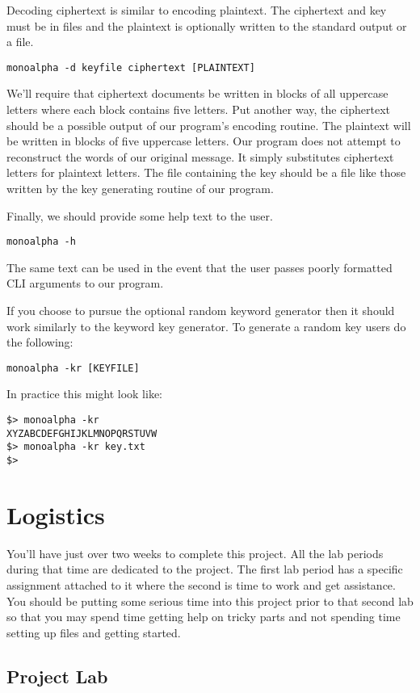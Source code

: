 \documentclass[]{tufte-handout}
\begin{document}
Decoding ciphertext is similar to encoding plaintext. The ciphertext and key must be in files and the plaintext is optionally written to the standard output or a file. 
\begin{verbatim}
monoalpha -d keyfile ciphertext [PLAINTEXT]
\end{verbatim}
We'll require that ciphertext documents be written in blocks of all uppercase letters where each block contains five letters.  Put another way, the ciphertext should be a possible output of our program's encoding routine.  The plaintext will be written in blocks of five uppercase letters. Our program does not attempt to reconstruct the words of our original message. It simply substitutes ciphertext letters for plaintext letters. The file containing the key should be a file like those written by the key generating routine of our program.

Finally, we should provide some help text to the user.
\begin{verbatim}
monoalpha -h
\end{verbatim}
The same text can be used in the event that the user passes poorly formatted CLI arguments to our program.

If you choose to pursue the optional random keyword generator then it should work similarly to the keyword key generator. To generate a random key users do the following:
\begin{verbatim}
monoalpha -kr [KEYFILE]
\end{verbatim}  
In practice this might look like: 
\begin{verbatim}
$> monoalpha -kr
XYZABCDEFGHIJKLMNOPQRSTUVW
$> monoalpha -kr key.txt
$>
\end{verbatim}


\section{Logistics}

You'll have just over two weeks to complete this project. All the lab periods during that time are dedicated to the project. The first lab period has a specific assignment attached to it where the second is time to work and get assistance. You should be putting some serious time into this project prior to that second lab so that you may spend time getting help on tricky parts and not spending time setting up files and getting started. 

\subsection{Project Lab}
\end{document}
